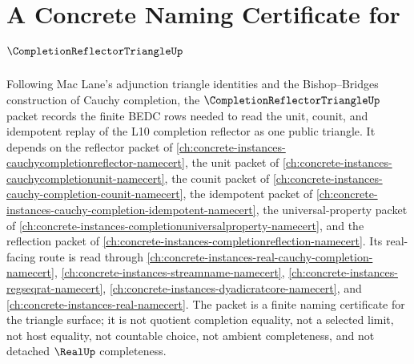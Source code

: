 \chapter{A Concrete Naming Certificate for $\CompletionReflectorTriangleUp$}
\label{ch:concrete-instances-completion-reflector-triangle-namecert}

Following Mac Lane's adjunction triangle identities and the Bishop--Bridges construction of Cauchy completion, the $\CompletionReflectorTriangleUp$ packet records the finite BEDC rows needed to read the unit, counit, and idempotent replay of the L10 completion reflector as one public triangle. It depends on the reflector packet of \autoref{ch:concrete-instances-cauchycompletionreflector-namecert}, the unit packet of \autoref{ch:concrete-instances-cauchycompletionunit-namecert}, the counit packet of \autoref{ch:concrete-instances-cauchy-completion-counit-namecert}, the idempotent packet of \autoref{ch:concrete-instances-cauchy-completion-idempotent-namecert}, the universal-property packet of \autoref{ch:concrete-instances-completionuniversalproperty-namecert}, and the reflection packet of \autoref{ch:concrete-instances-completionreflection-namecert}. Its real-facing route is read through \autoref{ch:concrete-instances-real-cauchy-completion-namecert}, \autoref{ch:concrete-instances-streamname-namecert}, \autoref{ch:concrete-instances-regseqrat-namecert}, \autoref{ch:concrete-instances-dyadicratcore-namecert}, and \autoref{ch:concrete-instances-real-namecert}. The packet is a finite naming certificate for the triangle surface; it is not quotient completion equality, not a selected limit, not host equality, not countable choice, not ambient completeness, and not detached $\RealUp$ completeness.

